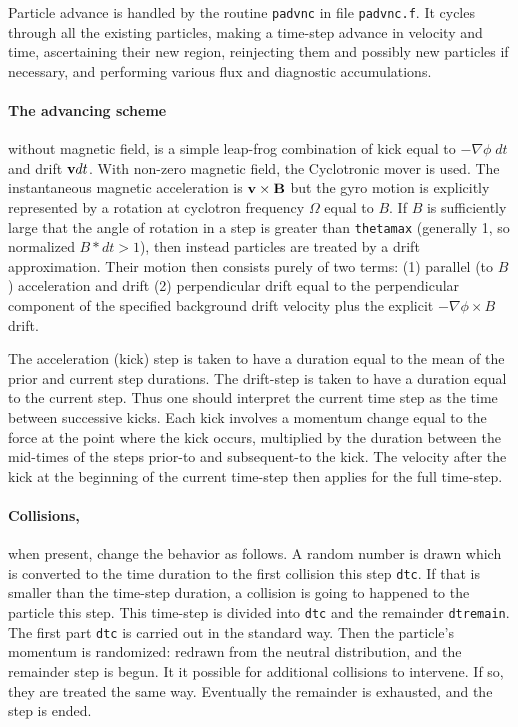 \documentclass[12pt]{article}
\begin{document}
Particle advance is handled by the routine \verb!padvnc! in file
\verb!padvnc.f!. It cycles through all the existing particles, making
a time-step advance in velocity and time, ascertaining their new
region, reinjecting them and possibly new particles if necessary, and
performing various flux and diagnostic accumulations.

\paragraph{The advancing scheme} without magnetic field, is a simple
leap-frog combination of kick equal to $-\nabla\phi\;dt$ and drift
${\bf v} dt$. With non-zero magnetic field, the Cyclotronic mover is
used. The instantaneous magnetic acceleration is
${\bf v}\times{\bf B}$ but the gyro motion is explicitly represented
by a rotation at cyclotron frequency $\Omega$ equal to $B$. If $B$ is
sufficiently large that the angle of rotation in a step is greater
than \verb!thetamax! (generally 1, so normalized $B*dt>1$), then
instead particles are treated by a drift approximation. Their motion
then consists purely of two terms: (1) parallel (to $B$) acceleration
and drift (2) perpendicular drift equal to the perpendicular component
of the specified background drift velocity plus the explicit
$-\nabla\phi\times B$ drift.

The acceleration (kick) step is taken to have a duration equal to the
mean of the prior and current step durations. The drift-step is taken
to have a duration equal to the current step. Thus one should
interpret the current time step as the time between successive
kicks. Each kick involves a momentum change equal to the force at the
point where the kick occurs, multiplied by the duration between the
mid-times of the steps prior-to and subsequent-to the kick. The
velocity after the kick at the beginning of the current time-step then
applies for the full time-step.

\paragraph{Collisions,} when present, change the behavior as follows. A
random number is drawn which is converted to the time duration to the
first collision this step \verb!dtc!. If that is smaller than the
time-step duration, a collision is going to happened to the particle
this step. This time-step is divided into \verb!dtc! and the remainder
\verb!dtremain!. The first part \verb!dtc! is carried out in the
standard way. Then the particle's momentum is randomized: redrawn from
the neutral distribution, and the remainder step is begun. It it
possible for additional collisions to intervene. If so, they are
treated the same way. Eventually the remainder is exhausted, and the
step is ended.
\end{document}
